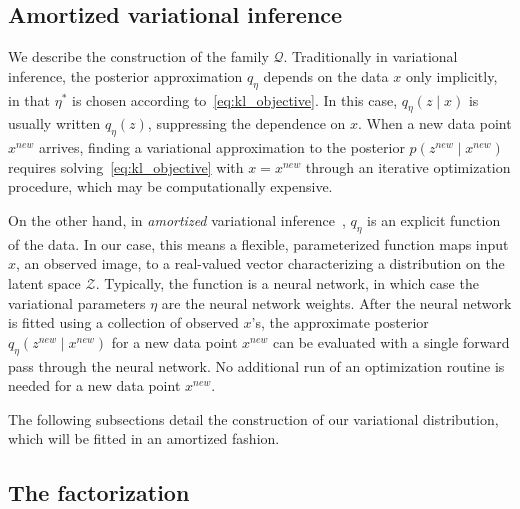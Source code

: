 \subsection{Amortized variational inference}
We describe the construction of the family $\mathcal{Q}$. 
Traditionally in variational inference, the posterior approximation $q_\eta$ depends on the data $x$ only implicitly,
in that $\eta^*$ is chosen according to~\eqref{eq:kl_objective}.
In this case, $q_\eta(z \mid x)$ is usually written $q_\eta(z)$, suppressing the dependence on $x$.
When a new data point $x^{new}$ arrives, finding a variational  approximation to the posterior $p(z^{new} \mid x^{new})$ requires solving~\eqref{eq:kl_objective} with $x = x^{new}$ through an iterative optimization procedure, which may be computationally expensive.



On the other hand,
in {\itshape amortized} variational
inference~\citep{kingma2013autoencoding, rezende2014stochastic}, $q_\eta$ is an explicit function of the data.
In our case, this means a flexible, parameterized function maps input $x$, an observed image, to a real-valued vector characterizing a distribution on the latent space $\mathcal{Z}$.
Typically, the function is a neural network, in which case the variational parameters $\eta$ are the neural network weights.
After the neural network is fitted using a collection of observed $x$'s, the approximate posterior $q_\eta(z^{new} \mid x^{new})$ for a new data point
$x^{new}$ can be evaluated with a single forward pass through the neural network.
No additional run of an optimization routine is needed for a new data point $x^{new}$.

The following subsections detail the construction of our variational distribution, which will 
be fitted in an amortized fashion. 


\subsection{The factorization}
\label{sec:factorization}

